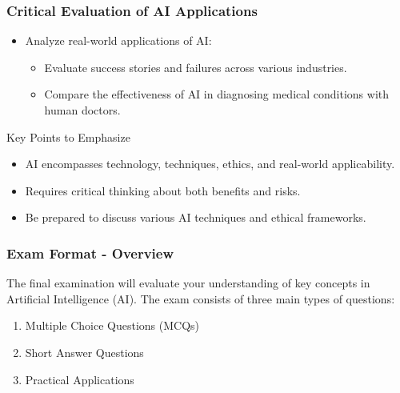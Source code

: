 \documentclass[aspectratio=169]{beamer}
\begin{document}
\begin{frame}[fragile]
    \frametitle{Critical Evaluation of AI Applications}
    \begin{itemize}
        \item Analyze real-world applications of AI:
        \begin{itemize}
            \item Evaluate success stories and failures across various industries.
            \item Compare the effectiveness of AI in diagnosing medical conditions with human doctors.
        \end{itemize}
    \end{itemize}
    
    \begin{block}{Key Points to Emphasize}
        \begin{itemize}
            \item AI encompasses technology, techniques, ethics, and real-world applicability.
            \item Requires critical thinking about both benefits and risks.
            \item Be prepared to discuss various AI techniques and ethical frameworks.
        \end{itemize}
    \end{block}
\end{frame}

\begin{frame}[fragile]
    \frametitle{Exam Format - Overview}
    The final examination will evaluate your understanding of key concepts in Artificial Intelligence (AI). The exam consists of three main types of questions: 
    \begin{enumerate}
        \item Multiple Choice Questions (MCQs)
        \item Short Answer Questions
        \item Practical Applications
    \end{enumerate}
\end{frame}
\end{document}
